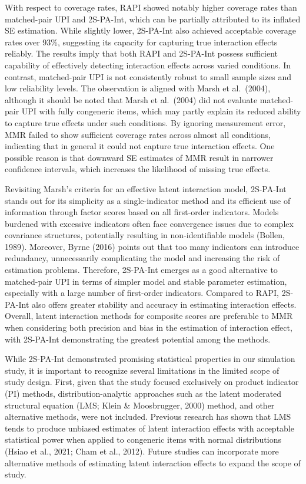 \documentclass[
  man]{apa6}
\begin{document}
With respect to coverage rates, RAPI showed notably higher coverage rates than matched-pair UPI and 2S-PA-Int, which can be partially attributed to its inflated SE estimation. While slightly lower, 2S-PA-Int also achieved acceptable coverage rates over 93\%, suggesting its capacity for capturing true interaction effects reliably. The results imply that both RAPI and 2S-PA-Int possess sufficient capability of effectively detecting interaction effects across varied conditions. In contrast, matched-pair UPI is not consistently robust to small sample sizes and low reliability levels. The observation is aligned with Marsh et al.~(2004), although it should be noted that Marsh et al.~(2004) did not evaluate matched-pair UPI with fully congeneric items, which may partly explain its reduced ability to capture true effects under such conditions. By ignoring measurement error, MMR failed to show sufficient coverage rates across almost all conditions, indicating that in general it could not capture true interaction effects. One possible reason is that downward SE estimates of MMR result in narrower confidence intervals, which increases the likelihood of missing true effects.

Revisiting Marsh's criteria for an effective latent interaction model, 2S-PA-Int stands out for its simplicity as a single-indicator method and its efficient use of information through factor scores based on all first-order indicators. Models burdened with excessive indicators often face convergence issues due to complex covariance structures, potentially resulting in non-identifiable models (Bollen, 1989). Moreover, Byrne (2016) points out that too many indicators can introduce redundancy, unnecessarily complicating the model and increasing the risk of estimation problems. Therefore, 2S-PA-Int emerges as a good alternative to matched-pair UPI in terms of simpler model and stable parameter estimation, especially with a large number of first-order indicators. Compared to RAPI, 2S-PA-Int also offers greater stability and accuracy in estimating interaction effects. Overall, latent interaction methods for composite scores are preferable to MMR when considering both precision and bias in the estimation of interaction effect, with 2S-PA-Int demonstrating the greatest potential among the methods.

While 2S-PA-Int demonstrated promising statistical properties in our simulation study, it is important to recognize several limitations in the limited scope of study design. First, given that the study focused exclusively on product indicator (PI) methods, distribution-analytic approaches such as the latent moderated structural equation (LMS; Klein \& Moosbrugger, 2000) method, and other alternative methods, were not included. Previous research has shown that LMS tends to produce unbiased estimates of latent interaction effects with acceptable statistical power when applied to congeneric items with normal distributions (Hsiao et al., 2021; Cham et al., 2012). Future studies can incorporate more alternative methods of estimating latent interaction effects to expand the scope of study.
\end{document}
